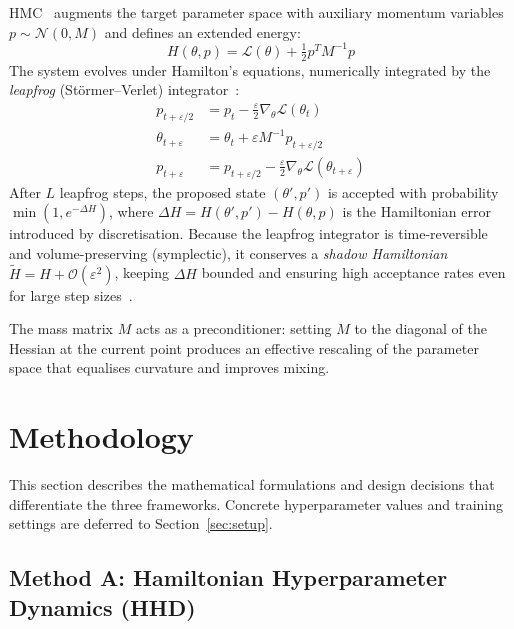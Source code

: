 \documentclass[11pt]{article}
\begin{document}
HMC~\cite{duane1987,neal2011} augments the target parameter space with
auxiliary momentum variables $p \sim \mathcal{N}(0, M)$ and defines
an extended energy:
\begin{equation}
H(\theta,p) = \mathcal{L}(\theta) + \tfrac{1}{2}p^TM^{-1}p
\label{eq:hmc}
\end{equation}
The system evolves under Hamilton's equations, numerically integrated
by the \emph{leapfrog} (St\"ormer--Verlet) integrator~\cite{leimkuhler2004}:
\begin{align}
p_{t+\varepsilon/2} &= p_t - \tfrac{\varepsilon}{2}\nabla_\theta\mathcal{L}(\theta_t)
\label{eq:lf1}\\
\theta_{t+\varepsilon} &= \theta_t + \varepsilon M^{-1}p_{t+\varepsilon/2}
\label{eq:lf2}\\
p_{t+\varepsilon}   &= p_{t+\varepsilon/2}
  - \tfrac{\varepsilon}{2}\nabla_\theta\mathcal{L}(\theta_{t+\varepsilon})
\label{eq:lf3}
\end{align}
After $L$ leapfrog steps, the proposed state $(\theta', p')$ is
accepted with probability $\min(1, e^{-\Delta H})$, where
$\Delta H = H(\theta', p') - H(\theta, p)$ is the Hamiltonian error
introduced by discretisation.  Because the leapfrog integrator is
time-reversible and volume-preserving (symplectic), it conserves a
\emph{shadow Hamiltonian} $\tilde{H} = H + \mathcal{O}(\varepsilon^2)$,
keeping $\Delta H$ bounded and ensuring high acceptance rates even for
large step sizes~\cite{hairer2006,betancourt2017}.

The mass matrix $M$ acts as a preconditioner: setting $M$ to the
diagonal of the Hessian at the current point produces an effective
rescaling of the parameter space that equalises curvature and improves
mixing.

\newpage


\section{Methodology}

This section describes the mathematical formulations and design
decisions that differentiate the three frameworks.  Concrete
hyperparameter values and training settings are deferred to
Section~\ref{sec:setup}.

\subsection{Method A: Hamiltonian Hyperparameter Dynamics (HHD)}
\end{document}
